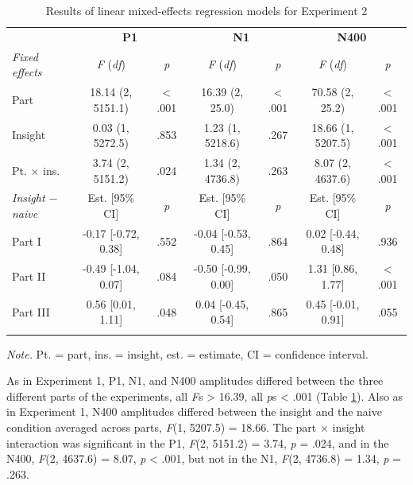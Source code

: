 \documentclass[
  english,
  man,11pt,floatsintext]{apa7}
\begin{document}
\begin{table}[tbp]

\begin{center}
\begin{threeparttable}

\caption{\label{tab:exp2-table}Results of linear mixed-effects regression models for Experiment 2}

\footnotesize{

\begin{tabular}{lcccccc}
\toprule
 & \multicolumn{2}{c}{\textbf{P1}} & \multicolumn{2}{c}{\textbf{N1}} & \multicolumn{2}{c}{\textbf{N400}} \\
\cmidrule(r){2-3} \cmidrule(r){4-5} \cmidrule(r){6-7}
\textit{Fixed effects} & \textit{F} (\textit{df}) & \textit{p} & \textit{F} (\textit{df}) & \textit{p} & \textit{F} (\textit{df}) & \textit{p}\\
\midrule
Part & 18.14 (2, 5151.1) & < .001 & 16.39 (2, 25.0) & < .001 & 70.58 (2, 25.2) & < .001\\
Insight & 0.03 (1, 5272.5) & .853 & 1.23 (1, 5218.6) & .267 & 18.66 (1, 5207.5) & < .001\\
Pt. × ins. & 3.74 (2, 5151.2) & .024 & 1.34 (2, 4736.8) & .263 & 8.07 (2, 4637.6) & < .001\\
\textit{Insight $-$  naive} & Est. [95\% CI] & \textit{p} & Est. [95\% CI] & \textit{p} & Est. [95\% CI] & \textit{p}\\ \midrule
Part I & -0.17 [-0.72, 0.38] & .552 & -0.04 [-0.53, 0.45] & .864 & 0.02 [-0.44, 0.48] & .936\\
Part II & -0.49 [-1.04, 0.07] & .084 & -0.50 [-0.99, 0.00] & .050 & 1.31 [0.86, 1.77] & < .001\\
Part III & 0.56 [0.01, 1.11] & .048 & 0.04 [-0.45, 0.54] & .865 & 0.45 [-0.01, 0.91] & .055\\
\bottomrule
\addlinespace
\end{tabular}

}

\begin{tablenotes}[para]
\normalsize{\textit{Note.} Pt. = part, ins. = insight, est. = estimate, CI = confidence interval.}
\end{tablenotes}

\end{threeparttable}
\end{center}

\end{table}

As in Experiment 1, P1, N1, and N400 amplitudes differed between the three different parts of the experiments, all \emph{F}s \textgreater{} 16.39, all \emph{p}s \textless{} .001 (Table \ref{tab:exp2-table}). Also as in Experiment 1, N400 amplitudes differed between the insight and the naive condition averaged across parts, \emph{F}(1, 5207.5) = 18.66. The part × insight interaction was significant in the P1, \emph{F}(2, 5151.2) = 3.74, \emph{p} = .024, and in the N400, \emph{F}(2, 4637.6) = 8.07, \emph{p} \textless{} .001, but not in the N1, \emph{F}(2, 4736.8) = 1.34, \emph{p} = .263.
\end{document}
